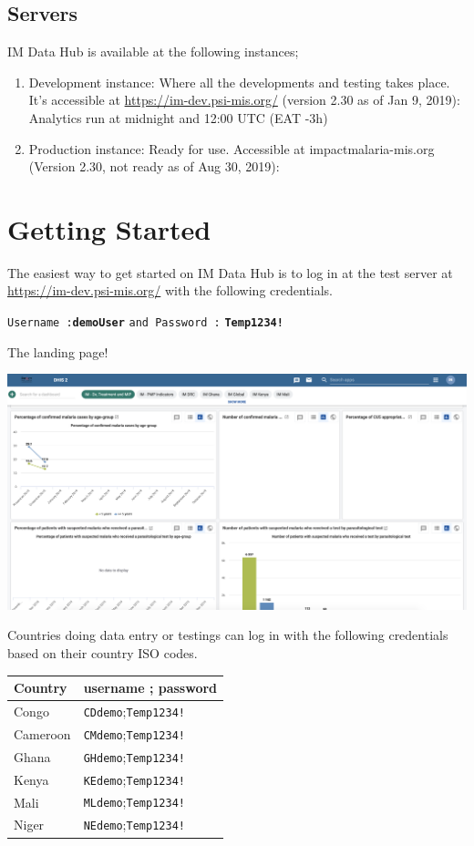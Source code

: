 \documentclass[]{book}
\providecommand{\tightlist}{%
  \setlength{\itemsep}{0pt}\setlength{\parskip}{0pt}}
\begin{document}
\hypertarget{servers}{%
\subsection{Servers}\label{servers}}

IM Data Hub is available at the following instances;

\begin{enumerate}
\def\labelenumi{\arabic{enumi}.}
\tightlist
\item
  Development instance: Where all the developments and testing takes place. It's accessible at \url{https://im-dev.psi-mis.org/} (version 2.30 as of Jan 9, 2019): Analytics run at midnight and 12:00 UTC (EAT -3h)
\item
  Production instance: Ready for use. Accessible at impactmalaria-mis.org (Version 2.30, not ready as of Aug 30, 2019):
\end{enumerate}

\hypertarget{getting-started}{%
\section{Getting Started}\label{getting-started}}

The easiest way to get started on IM Data Hub is to log in at the test server at \url{https://im-dev.psi-mis.org/} with the following credentials.

\texttt{Username\ :}\textbf{\texttt{demoUser}} \texttt{and\ Password\ :} \textbf{\texttt{Temp1234!}}

The landing page!

\includegraphics[width=46.08in]{./images/landing-page}

Countries doing data entry or testings can log in with the following credentials based on their country ISO codes.

\begin{longtable}[]{@{}ll@{}}
\toprule
Country & username ; password\tabularnewline
\midrule
\endhead
Congo & \texttt{CDdemo};\texttt{Temp1234!}\tabularnewline
Cameroon & \texttt{CMdemo};\texttt{Temp1234!}\tabularnewline
Ghana & \texttt{GHdemo};\texttt{Temp1234!}\tabularnewline
Kenya & \texttt{KEdemo};\texttt{Temp1234!}\tabularnewline
Mali & \texttt{MLdemo};\texttt{Temp1234!}\tabularnewline
Niger & \texttt{NEdemo};\texttt{Temp1234!}\tabularnewline
\bottomrule
\end{longtable}
\end{document}
